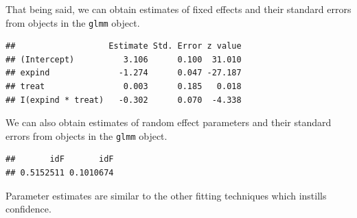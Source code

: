 \documentclass[
  ignorenonframetext,
]{beamer}
\newenvironment{Shaded}{\begin{snugshade}}{\end{snugshade}}
\newcommand{\CommentTok}[1]{\textcolor[rgb]{0.56,0.35,0.01}{\textit{#1}}}
\newcommand{\DecValTok}[1]{\textcolor[rgb]{0.00,0.00,0.81}{#1}}
\newcommand{\FunctionTok}[1]{\textcolor[rgb]{0.00,0.00,0.00}{#1}}
\newcommand{\NormalTok}[1]{#1}
\newcommand{\OtherTok}[1]{\textcolor[rgb]{0.56,0.35,0.01}{#1}}
\newcommand{\SpecialCharTok}[1]{\textcolor[rgb]{0.00,0.00,0.00}{#1}}
\newcommand{\StringTok}[1]{\textcolor[rgb]{0.31,0.60,0.02}{#1}}
\begin{document}
\begin{frame}[fragile]{}
\protect\hypertarget{section-16}{}
That being said, we can obtain estimates of fixed effects and their
standard errors from objects in the \texttt{glmm} object.

\vspace{12pt}
\tiny

\begin{Shaded}
\end{Shaded}

\begin{verbatim}
##                   Estimate Std. Error z value
## (Intercept)          3.106      0.100  31.010
## expind              -1.274      0.047 -27.187
## treat                0.003      0.185   0.018
## I(expind * treat)   -0.302      0.070  -4.338
\end{verbatim}
\end{frame}

\begin{frame}[fragile]{}
\protect\hypertarget{section-17}{}
We can also obtain estimates of random effect parameters and their
standard errors from objects in the \texttt{glmm} object.

\vspace{12pt}
\tiny

\begin{Shaded}
\end{Shaded}

\begin{verbatim}
##       idF       idF 
## 0.5152511 0.1010674
\end{verbatim}

\vspace{12pt}
\normalsize

Parameter estimates are similar to the other fitting techniques which
instills confidence.
\end{frame}
\end{document}
